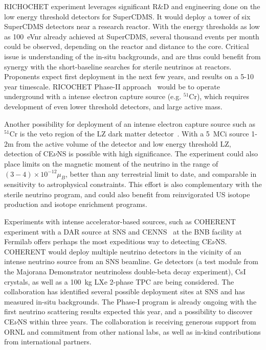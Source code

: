 RICHOCHET experiment leverages significant R\&D and engineering done
on the low energy threshold detectors for SuperCDMS. It would deploy a
tower of six SuperCDMS detectors near a research reactor. With the
energy thresholds as low as 100~eVnr already achieved at SuperCDMS,
several thousand events per month could be observed, depending on the
reactor and distance to the core. Critical issue is understanding of
the in-situ backgrounds, and are thus could benefit from synergy with
the short-baseline searches for sterile neutrinos at reactors.
Proponents expect first deployment in the next few years, and results
on a 5-10 year timescale.  RICOCHET Phase-II
approach~\cite{Formaggio:2011jt} would be to operate underground with
a intense electron capture source (e.g. $^{51}$Cr), which requires
development of even lower threshold detectors, and large active mass. 

Another possibility for deployment of an intense electron capture
source such as $^{51}$Cr is the veto region of the LZ dark matter
detector~\cite{Coloma:2014hka}. With a 5~MCi source 1-2m from the
active volume of the detector and low energy threshold LZ, detection
of CE$\nu$NS is possible with high significance. The experiment could
also place limits on the magnetic moment of the neutrino in the range
of $(3-4)\times10^{-12}\mu_B$, better than any terrestrial limit to
date, and comparable in sensitivity to astrophysical constraints. This
effort is also complementary with the sterile neutrino program, and
could also benefit from reinvigorated US isotope production and
isotope enrichment programs.


Experiments with intense accelerator-based sources, such as
COHERENT~\cite{Akimov:2013yow} experiment with a DAR source at SNS and
CENNS~\cite{Brice:2013fwa} at the BNB facility at Fermilab offers
perhaps the most expeditious way to detecting CE$\nu$NS. COHERENT
would deploy multiple neutrino detectors in the vicinity of an intense
neutrino source from an SNS beamline. Ge detectors (a test module from
the {\sc Majorana Demonstrator\/} neutrinoless double-beta decay
experiment), CsI crystals, as well as a 100~kg LXe 2-phase TPC are
being considered. The collaboration has identified several possible
deployment sites at SNS and has measured in-situ backgrounds.  The
Phase-I program is already ongoing with the first neutrino scattering
results expected this year, and a possibility to discover CE$\nu$NS
within three years. The collaboration is receiving generous support
from ORNL and commitment from other national labs, as well as in-kind
contributions from international partners. 


